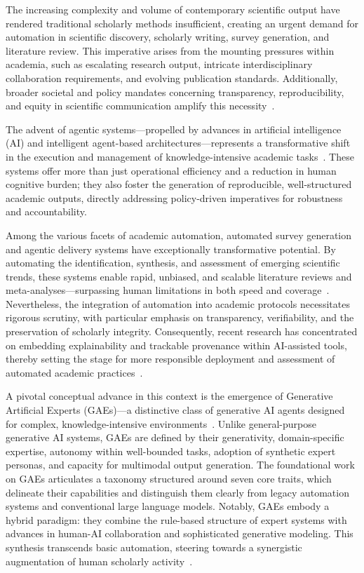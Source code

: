 The increasing complexity and volume of contemporary scientific output have rendered traditional scholarly methods insufficient, creating an urgent demand for automation in scientific discovery, scholarly writing, survey generation, and literature review. This imperative arises from the mounting pressures within academia, such as escalating research output, intricate interdisciplinary collaboration requirements, and evolving publication standards. Additionally, broader societal and policy mandates concerning transparency, reproducibility, and equity in scientific communication amplify this necessity~\cite{ref106,ref111}. 

The advent of agentic systems---propelled by advances in artificial intelligence (AI) and intelligent agent-based architectures---represents a transformative shift in the execution and management of knowledge-intensive academic tasks~\cite{ref16,ref106,ref111}. These systems offer more than just operational efficiency and a reduction in human cognitive burden; they also foster the generation of reproducible, well-structured academic outputs, directly addressing policy-driven imperatives for robustness and accountability.

Among the various facets of academic automation, automated survey generation and agentic delivery systems have exceptionally transformative potential. By automating the identification, synthesis, and assessment of emerging scientific trends, these systems enable rapid, unbiased, and scalable literature reviews and meta-analyses---surpassing human limitations in both speed and coverage~\cite{ref106,ref111}. Nevertheless, the integration of automation into academic protocols necessitates rigorous scrutiny, with particular emphasis on transparency, verifiability, and the preservation of scholarly integrity. Consequently, recent research has concentrated on embedding explainability and trackable provenance within AI-assisted tools, thereby setting the stage for more responsible deployment and assessment of automated academic practices~\cite{ref101,ref102,ref103,ref104,ref105,ref106}.

A pivotal conceptual advance in this context is the emergence of Generative Artificial Experts (GAEs)---a distinctive class of generative AI agents designed for complex, knowledge-intensive environments~\cite{ref16}. Unlike general-purpose generative AI systems, GAEs are defined by their generativity, domain-specific expertise, autonomy within well-bounded tasks, adoption of synthetic expert personas, and capacity for multimodal output generation. The foundational work on GAEs articulates a taxonomy structured around seven core traits, which delineate their capabilities and distinguish them clearly from legacy automation systems and conventional large language models. Notably, GAEs embody a hybrid paradigm: they combine the rule-based structure of expert systems with advances in human-AI collaboration and sophisticated generative modeling. This synthesis transcends basic automation, steering towards a synergistic augmentation of human scholarly activity~\cite{ref16}.

